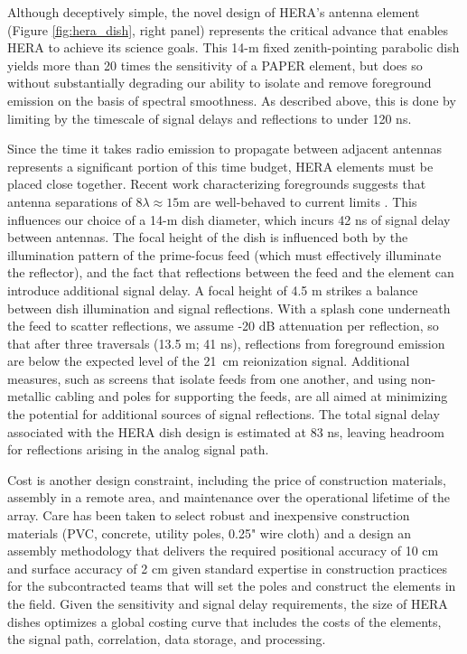 \documentclass[preprint]{aastex}
\begin{document}
Although deceptively simple, the novel design of HERA's antenna element
(Figure \ref{fig:hera_dish}, right panel) represents the critical advance
that enables HERA to achieve its science goals.  This 14-m
fixed zenith-pointing parabolic dish yields more than 20 times
the sensitivity of a PAPER element, but does so without substantially degrading
our ability to isolate and remove foreground emission on the basis of
spectral smoothness.  As described above, this is done by limiting by 
the timescale of signal delays and reflections to under 120 ns.

Since the time it takes radio emission to propagate between adjacent antennas 
represents a significant portion of this time budget, HERA elements must be placed close together.
Recent work characterizing foregrounds suggests that 
antenna separations of $8\lambda \approx 15$m are
well-behaved to current limits \citep{pober_et_al2013b,parsons_et_al2013}. This influences our
choice of a 14-m dish diameter,
which incurs 42 ns of signal delay between antennas.
The focal height of the dish is influenced both by the illumination pattern of the prime-focus
feed (which must effectively illuminate the reflector), and the fact that reflections
between the feed and the element%
can introduce additional signal delay.  A focal height of 4.5 m
strikes a balance between dish illumination and signal reflections.  
With a splash cone underneath the feed to scatter reflections, we assume -20 dB
attenuation per reflection, so that after three traversals (13.5 m; 41 ns), reflections from
foreground emission are below the expected level of the 21~cm reionization signal.
Additional measures, such as screens that isolate feeds from one another, and using
non-metallic cabling and poles for supporting the feeds, are all aimed at minimizing
the potential for additional sources of signal reflections.
The total signal delay associated with the HERA dish design is estimated at 83 ns, leaving
headroom for reflections arising in the analog signal path.

Cost is another design constraint, including the price of construction
materials, assembly in a remote area, and maintenance over the operational
lifetime of the array.  Care has been taken to select robust and inexpensive
construction materials (PVC, concrete, utility poles, 0.25" wire cloth) and a
design an assembly methodology that delivers the required positional
accuracy of 10 cm and surface accuracy of 2 cm given standard expertise in construction
practices for the subcontracted teams that will set the poles and construct the
elements in the field.  Given the sensitivity and signal delay requirements, the size of HERA
dishes optimizes a global costing curve that includes the costs of the elements,
the signal path, correlation, data storage, and processing.
\end{document}
